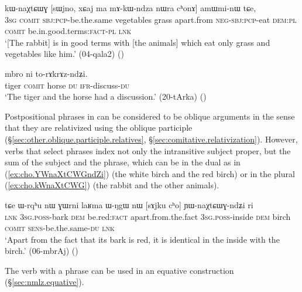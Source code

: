 \begin{exe}
\ex \label{ex:cho.kWnaXtCWG}
 kɯ-naχtɕɯɣ [sɯjno, xɕaj ma mɤ-kɯ-ndza nɯra cʰonɤ] amɯmi-nɯ tɕe, \\
\textsc{3sg} \textsc{comit} \textsc{sbj}:\textsc{pcp}-be.the.same vegetables grass apart.from \textsc{neg}-\textsc{sbj}:\textsc{pcp}-eat \textsc{dem}:\textsc{pl} \textsc{comit} be.in.good.terms:\textsc{fact}-\textsc{pl} \textsc{lnk} \\
\glt `[The rabbit] is in good terms with [the animals] which eat only grass and vegetables like him.' (04-qala2)
()
\end{exe}

\begin{exe}
\ex \label{ex:cho.torAkrAzndZi}
 mbro ni to-rɤkrɤz-ndʑi. \\
tiger \textsc{comit} horse \textsc{du} \textsc{ifr}-discuss-\textsc{du} \\
\glt `The tiger and the horse had a discussion.' (20-tArka)
()
\end{exe}

Postpositional phrases in  can be considered to be oblique arguments in the sense that they are relativized using the oblique participle (§\ref{sec:other.oblique.participle.relatives}, §\ref{sec:comitative.relativization}). However, verbs that select  phrases index not only the intransitive subject proper, but the sum of the subject and the  phrase, which can be in the dual as in (\ref{ex:cho.YWnaXtCWGndZi}) (the white birch and the red birch) or in the plural (\ref{ex:cho.kWnaXtCWG}) (the rabbit and the other animals). 

\begin{exe}
\ex \label{ex:cho.YWnaXtCWGndZi}
\gll tɕe ɯ-rqʰu nɯ ɣɯrni laʁma ɯ-ŋgɯ nɯ [sɤjku cʰo] ɲɯ-naχtɕɯɣ-ndʑi ri\\
\textsc{lnk} \textsc{3sg}.\textsc{poss}-bark \textsc{dem} be.red:\textsc{fact} apart.from.the.fact \textsc{3sg}.\textsc{poss}-inside \textsc{dem} birch \textsc{comit} \textsc{sens}-be.the.same-\textsc{du} \textsc{lnk} \\
\glt `Apart from the fact that its bark is red, it is identical in the inside with the birch.' (06-mbrAj)
()
\end{exe}

The verb  with a  phrase can be used in an equative construction (§\ref{sec:nmlz.equative}).

